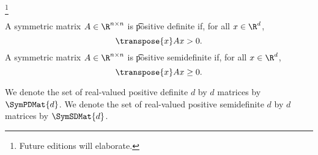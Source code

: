 
\footnote{Future editions will elaborate.}


A symmetric matrix $A \in \R^{n \times n}$ is \t{positive definite} if, for all $x \in \R^{d}$,
\[
  \transpose{x}Ax > 0.
\]
A symmetric matrix $A \in \R^{n \times n}$ is \t{positive semidefinite} if, for all $x \in \R^{d}$,
\[
  \transpose{x}Ax \geq 0.
\]


We denote the set of real-valued positive definite $d$ by $d$ matrices by $\SymPDMat{d}$.
We denote the set of real-valued positive semidefinite $d$ by $d$ matrices by $\SymSDMat{d}$.

\blankpage
